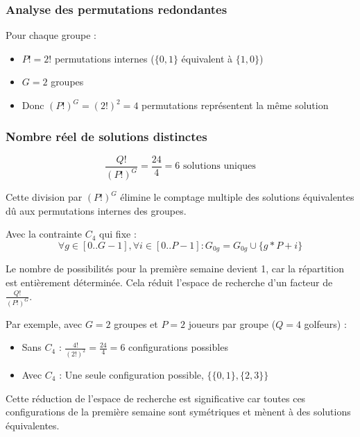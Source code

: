 \documentclass{article}
\begin{document}
\begin{itemize}[label=\textbullet]
\subsubsection*{Analyse des permutations redondantes}
Pour chaque groupe :
\begin{itemize}[label=\textendash]
\item $P! = 2!$ permutations internes ($\{0,1\}$ équivalent à $\{1,0\}$)
\item $G = 2$ groupes
\item Donc $(P!)^G = (2!)^2 = 4$ permutations représentent la même solution
\end{itemize}

\subsubsection*{Nombre réel de solutions distinctes}
\[ \frac{Q!}{(P!)^G} = \frac{24}{4} = 6 \text{ solutions uniques} \]

Cette division par $(P!)^G$ élimine le comptage multiple des solutions équivalentes dû aux permutations internes des groupes.

Avec la contrainte $C_4$ qui fixe :
\[ \forall g \in [0..G-1], \forall i \in [0..P-1] : G_{0g} = G_{0g} \cup \{g*P + i\} \]

Le nombre de possibilités pour la première semaine devient 1, car la répartition est entièrement déterminée. Cela réduit l'espace de recherche d'un facteur de $\frac{Q!}{(P!)^G}$.

Par exemple, avec $G=2$ groupes et $P=2$ joueurs par groupe ($Q=4$ golfeurs) :
\begin{itemize}[label=\textendash]
\item Sans $C_4$ : $\frac{4!}{(2!)^2} = \frac{24}{4} = 6$ configurations possibles
\item Avec $C_4$ : Une seule configuration possible, $\{\{0,1\}, \{2,3\}\}$
\end{itemize}

Cette réduction de l'espace de recherche est significative car toutes ces configurations de la première semaine sont symétriques et mènent à des solutions équivalentes.


\end{itemize}
\end{document}
